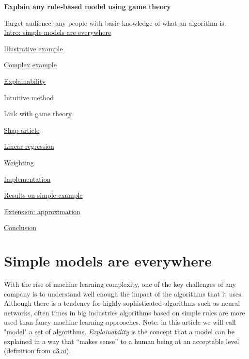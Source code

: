 {\fontsize{30pt}{40pt} \textbf{Explain any rule-based model using game theory}\par}

\vspace{10mm}

Target audience: any people with basic knowledge of what an algorithm is. \\

\hyperref[sec:simple-models-everywhere]{Intro: simple models are everywhere}

\hyperref[sec:illustrative-example]{Illustrative example}

\hyperref[sec:complex-example]{Complex example}

\hyperref[sec:explainability]{Explainability}

\hyperref[sec:intuitive-method]{Intuitive method}

\hyperref[sec:link-with-game-theory]{Link with game theory}

\hyperref[sec:shap-article]{Shap article}

\hyperref[sec:linear-regression]{Linear regression}

\hyperref[sec:weighting]{Weighting}

\hyperref[sec:implementation]{Implementation}

\hyperref[sec:results-simple-example]{Results on simple example}

\hyperref[sec:extension-approximation]{Extension: approximation}

\hyperref[sec:conclusion]{Conclusion}


\section{Simple models are everywhere}

\label{sec:simple-models-everywhere}

With the rise of machine learning complexity, one of the key challenges of any company is to understand well enough the impact of the algorithms that it uses. Although there is a tendency for highly sophisticated algorithms such as neural networks, often times in big industries algorithms based on simple rules are more used than fancy machine learning approaches. Note: in this article we will call "model" a set of algorithms. \textit{Explainability} is the concept that a model can be explained in a way that “makes sense” to a human being at an acceptable level (definition from \href{https://c3.ai/glossary/machine-learning/explainability/}{c3.ai}). \\

